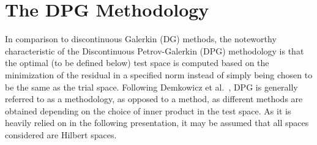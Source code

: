 \chapter{The DPG Methodology}

In comparison to discontinuous Galerkin (DG) methods, the noteworthy characteristic of the Discontinuous Petrov-Galerkin
(DPG) methodology is that the optimal (to be defined below) test space is computed based on the minimization of the
residual in a specified norm instead of simply being chosen to be the same as the trial space.  Following Demkowicz et
al.~\cite{Demkowicz2017}, DPG is generally referred to as a methodology, as opposed to a method, as different methods
are obtained depending on the choice of inner product in the test space. As it is heavily relied on in the following
presentation, it may be assumed that all spaces considered are Hilbert spaces.


